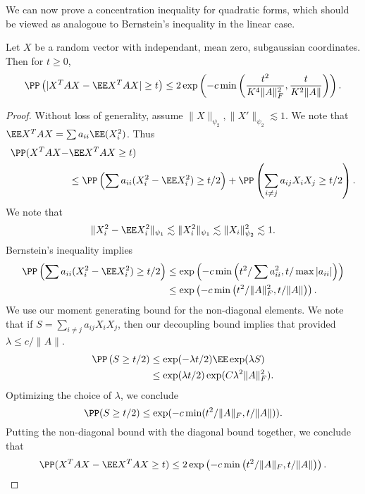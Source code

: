 We can now prove a concentration inequality for quadratic forms, which should be viewed as analogoue to Bernstein's inequality in the linear case.

\begin{theorem}
    Let $X$ be a random vector with independant, mean zero, subgaussian coordinates. Then for $t \geq 0$,
    \[ \PP \left( |X^T A X - \EE X^T A X| \geq t \right) \leq 2 \exp\left( -c \min \left( \frac{t^2}{K^4 \| A \|_F^2}, \frac{t}{K^2 \| A \|} \right) \right). \]
\end{theorem}
\begin{proof}
    Without loss of generality, assume $\| X \|_{\psi_2}, \| X' \|_{\psi_2} \lesssim 1$. We note that $\EE X^T A X = \sum a_{ii} \EE(X_i^2)$. Thus
    \begin{align*}
        \PP(X^T A X - &\EE X^T A X \geq t)\\
        &\leq \PP \left(\sum a_{ii}(X_i^2 - \EE X_i^2) \geq t/2 \right) + \PP \left(\sum_{i \neq j} a_{ij} X_i X_j \geq t/2 \right).
    \end{align*}
    We note that
    \[ \| X_i^2 - \EE X_i^2 \|_{\psi_1} \lesssim \| X_i^2 \|_{\psi_1} \lesssim \| X_i \|_{\psi_2}^2 \lesssim 1. \]
    Bernstein's inequality implies
    \begin{align*}
        \PP \left( \sum a_{ii}(X_i^2 - \EE X_i^2) \geq t/2 \right) &\leq \exp \left( -c \min \left( t^2 / \sum a_{ii}^2, t/\max |a_{ii}| \right) \right)\\
        &\leq \exp \left( -c \min \left(t^2/ \|A \|_F^2, t/\|A\| \right) \right).
    \end{align*}
    We use our moment generating bound for the non-diagonal elements. We note that if $S = \sum_{i \neq j} a_{ij} X_i X_j$, then our decoupling bound implies that provided $\lambda \leq c / \| A \|$.
    \begin{align*}
        \PP \left( S \geq t/2 \right) &\leq \exp(-\lambda t / 2) \EE \exp(\lambda S)\\
        &\leq \exp(\lambda t/2) \exp(C \lambda^2 \| A \|_F^2).
    \end{align*}
    Optimizing the choice of $\lambda$, we conclude
    \[ \PP(S \geq t/2) \leq \exp(-c \min(t^2/ \| A \|_F, t/\|A\|)). \]
    Putting the non-diagonal bound with the diagonal bound together, we conclude that
    \[ \PP (X^T A X - \EE X^T A X \geq t) \leq 2 \exp \left(-c \min \left(t^2/\|A \|_F, t/\|A\| \right) \right). \qedhere \]
\end{proof}

